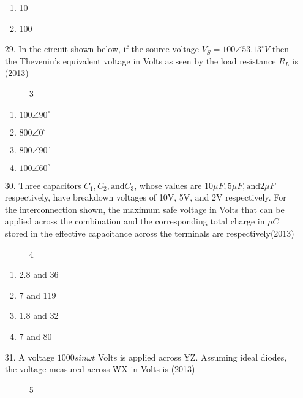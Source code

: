 \documentclass[journal]{IEEEtran}
\begin{document}
\begin{enumerate}
\begin{enumerate}[label=(\Alph*)]
        \item 10
        \item 100
    \end{enumerate}
    \item[29.] In the circuit shown below, if the source voltage $V_S = 100\angle53.13^{\circ} V$ then the Thevenin's equivalent
    voltage in Volts as seen by the load resistance $R_L$ is \hfill (2013)
    \begin{figure}[!ht]
        \centering
        \caption{3}
    \end{figure}
    \begin{enumerate}[label=(\Alph*)]
        \item $100\angle90^{\circ}$
        \item $800\angle0^{\circ}$
        \item $800\angle90^{\circ}$
        \item $100\angle60^{\circ}$
    \end{enumerate}
    \item[30.] Three capacitors $C_1, C_2, \text{and} C_3$, whose values are $10\mu F, 5\mu F, \text{and} 2\mu F$ respectively, have
    breakdown voltages of 10V, 5V, and 2V respectively. For the interconnection shown, the maximum
    safe voltage in Volts that can be applied across the combination and the corresponding total charge
    in $\mu C$ stored in the effective capacitance across the terminals are respectively\hfill (2013)
    \begin{figure}[!ht]
        \centering
        \caption{4}
    \end{figure}
    \begin{enumerate}[label=(\Alph*)]
        \item 2.8 and 36
        \item 7 and 119
        \item 1.8 and 32
        \item 7 and 80
    \end{enumerate}
    \item[31.] A voltage $1000sin\omega t$ Volts is applied across YZ. Assuming ideal diodes, the voltage measured
    across WX in Volts is \hfill (2013)
    \begin{figure}[!ht]
        \centering
        \caption{5}

\end{figure}
\end{enumerate}
\end{document}
